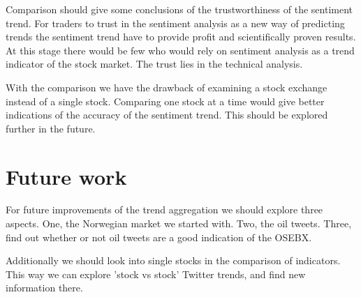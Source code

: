 Comparison should give some conclusions of the trustworthiness of the
sentiment trend. For traders to trust in the sentiment analysis as a new way of
predicting trends the sentiment trend have to provide profit and scientifically
proven results. At this stage there would be few who would rely on sentiment
analysis as a trend indicator of the stock market. The trust lies in the
technical analysis.  

With the comparison we have the drawback of examining a stock exchange instead
of a single stock. Comparing one stock at a time would give better indications of
the accuracy of the sentiment trend. This should be explored further in the
future.   
%

\section{Future work}
For future improvements of the trend aggregation we should explore three aspects.
One, the Norwegian market we started with. Two, the oil tweets. Three, find
out whether or not oil tweets are a good indication of the OSEBX. 

Additionally we should look into single stocks in the comparison of indicators.
This way we can explore 'stock vs stock' Twitter trends, and find new information
there.
%
